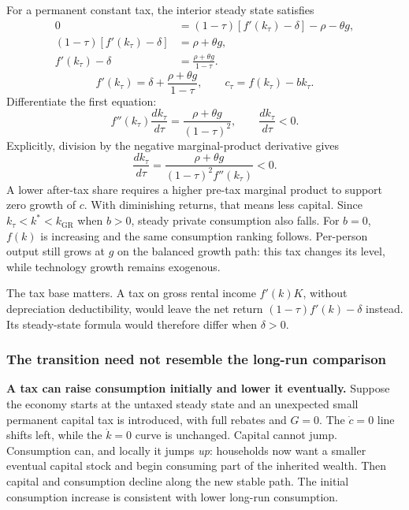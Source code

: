 For a permanent constant tax, the interior steady state satisfies
\begin{align}
0&=(1-\tau)[f'(k_\tau)-\delta]-\rho-\theta g,\\
(1-\tau)[f'(k_\tau)-\delta]&=\rho+\theta g,\\
f'(k_\tau)-\delta&=\frac{\rho+\theta g}{1-\tau}.
\end{align}
\begin{equation}
f'(k_\tau)=\delta+\frac{\rho+\theta g}{1-\tau},
\qquad c_\tau=f(k_\tau)-bk_\tau.
\end{equation}
Differentiate the first equation:
\begin{equation}
f''(k_\tau)\frac{dk_\tau}{d\tau}
=\frac{\rho+\theta g}{(1-\tau)^2},
\qquad \frac{dk_\tau}{d\tau}<0.
\end{equation}
Explicitly, division by the negative marginal-product derivative gives
\[
\frac{dk_\tau}{d\tau}
 =\frac{\rho+\theta g}{(1-\tau)^2f''(k_\tau)}<0.
\]
A lower after-tax share requires a higher pre-tax marginal product to support
zero growth of $c$. With diminishing returns, that means less capital. Since
$k_\tau<k^*<k_{\mathrm{GR}}$ when $b>0$, steady private consumption also falls.
For $b=0$, $f(k)$ is increasing and the same consumption ranking follows.
Per-person output still grows at $g$ on the balanced growth path: this tax
changes its level, while technology growth remains exogenous.

The tax base matters. A tax on gross rental income $f'(k)K$, without depreciation
deductibility, would leave the net return $(1-\tau)f'(k)-\delta$ instead. Its
steady-state formula would therefore differ when $\delta>0$.

\subsubsection{The transition need not resemble the long-run comparison}

\begin{blueblock}
\textbf{A tax can raise consumption initially and lower it eventually.}
Suppose the economy starts at the untaxed steady state and an unexpected small
permanent capital tax is introduced, with full rebates and $G=0$. The
$\dot c=0$ line shifts left, while the $\dot k=0$ curve is unchanged. Capital
cannot jump. Consumption can, and locally it jumps \emph{up}: households now
want a smaller eventual capital stock and begin consuming part of the inherited
wealth. Then capital and consumption decline along the new stable path.
The initial consumption increase is consistent with lower long-run consumption.
\end{blueblock}

